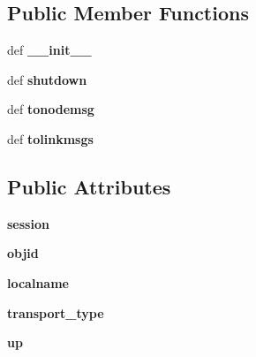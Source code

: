 \subsection*{Public Member Functions}
\begin{DoxyCompactItemize}
\item 
\hypertarget{classcore_1_1netns_1_1vif_1_1_gre_tap_a18158b38d4c1ce83faddbfb96762de73}{def {\bfseries \+\_\+\+\_\+init\+\_\+\+\_\+}}\label{classcore_1_1netns_1_1vif_1_1_gre_tap_a18158b38d4c1ce83faddbfb96762de73}

\item 
\hypertarget{classcore_1_1netns_1_1vif_1_1_gre_tap_a468273a494fdc8d24bec47ea87126f46}{def {\bfseries shutdown}}\label{classcore_1_1netns_1_1vif_1_1_gre_tap_a468273a494fdc8d24bec47ea87126f46}

\item 
\hypertarget{classcore_1_1netns_1_1vif_1_1_gre_tap_a7504207185f8c1d535ae2ac239bfd64b}{def {\bfseries tonodemsg}}\label{classcore_1_1netns_1_1vif_1_1_gre_tap_a7504207185f8c1d535ae2ac239bfd64b}

\item 
\hypertarget{classcore_1_1netns_1_1vif_1_1_gre_tap_acecf55313d89a561cfc7fefea51bd2b9}{def {\bfseries tolinkmsgs}}\label{classcore_1_1netns_1_1vif_1_1_gre_tap_acecf55313d89a561cfc7fefea51bd2b9}

\end{DoxyCompactItemize}
\subsection*{Public Attributes}
\begin{DoxyCompactItemize}
\item 
\hypertarget{classcore_1_1netns_1_1vif_1_1_gre_tap_a4cd6272cbe81e10554e7cef0a2c0f968}{{\bfseries session}}\label{classcore_1_1netns_1_1vif_1_1_gre_tap_a4cd6272cbe81e10554e7cef0a2c0f968}

\item 
\hypertarget{classcore_1_1netns_1_1vif_1_1_gre_tap_a49cf88841b8a19a31592c63690eb05e0}{{\bfseries objid}}\label{classcore_1_1netns_1_1vif_1_1_gre_tap_a49cf88841b8a19a31592c63690eb05e0}

\item 
\hypertarget{classcore_1_1netns_1_1vif_1_1_gre_tap_a72fa9c01b500313fcb4a57c15848af11}{{\bfseries localname}}\label{classcore_1_1netns_1_1vif_1_1_gre_tap_a72fa9c01b500313fcb4a57c15848af11}

\item 
\hypertarget{classcore_1_1netns_1_1vif_1_1_gre_tap_a45cca2852412a499535c35acaff0b0f2}{{\bfseries transport\+\_\+type}}\label{classcore_1_1netns_1_1vif_1_1_gre_tap_a45cca2852412a499535c35acaff0b0f2}

\item 
\hypertarget{classcore_1_1netns_1_1vif_1_1_gre_tap_a840abbb7dbb07207f9bc01d58a1d48da}{{\bfseries up}}\label{classcore_1_1netns_1_1vif_1_1_gre_tap_a840abbb7dbb07207f9bc01d58a1d48da}

\end{DoxyCompactItemize}


